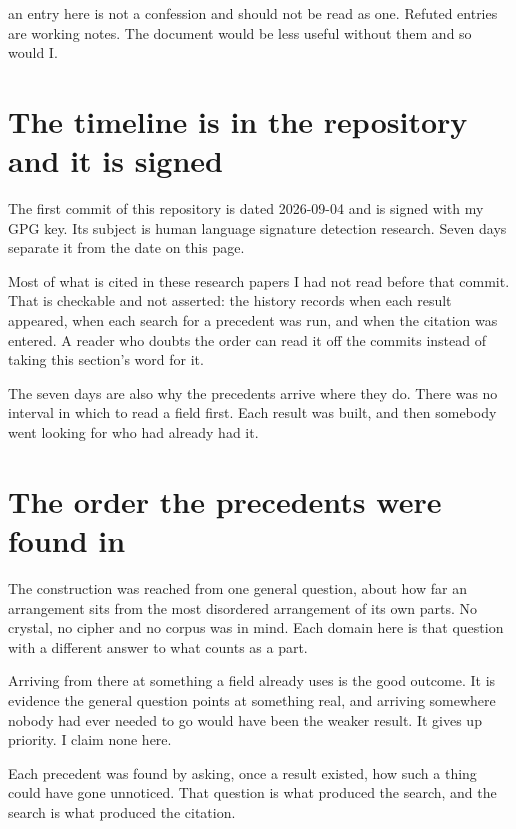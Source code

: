 an entry here is not a confession and should not be read as one. Refuted entries are
working notes. The document would be less useful without them and so would I.

\section*{The timeline is in the repository and it is signed}

The first commit of this repository is dated 2026-09-04 and is signed with my GPG key. Its subject is
human language signature detection research. Seven days separate it from the date on this page.

Most of what is cited in these research papers I had not read before that commit. That is checkable and not
asserted: the history records when each result appeared, when each search for a precedent was
run, and when the citation was entered. A reader who doubts the order can read it off the commits
instead of taking this section's word for it.

The seven days are also why the precedents arrive where they do. There was no interval in which to
read a field first. Each result was built, and then somebody went looking for who had already had
it.

\section*{The order the precedents were found in}

The construction was reached from one general question, about how far an arrangement sits from the
most disordered arrangement of its own parts. No crystal, no cipher and no corpus was in mind. Each
domain here is that question with a different answer to what counts as a part.

Arriving from there at something a field already uses is the good outcome. It is evidence the
general question points at something real, and arriving somewhere nobody had ever needed to go would
have been the weaker result. It gives up priority. I claim none here.

Each precedent was found by asking, once a result existed, how such a thing could have gone
unnoticed. That question is what produced the search, and the search is what produced the citation.

